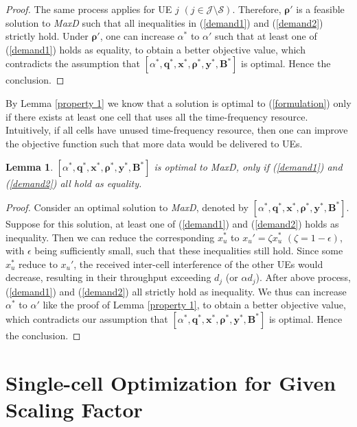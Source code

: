 \documentclass[10pt,journal,final,finalsubmission,twocolumn]{IEEEtran}
\newtheorem{lemma}[theorem]{Lemma}
\begin{document}
\begin{proof}
The same process applies for UE $j$ $(j\in \mathcal{J}\setminus\mathcal{S})$. Therefore, $\boldsymbol{\rho}'$ is a feasible solution to {\em MaxD} such that all inequalities in (\ref{demand1}) and (\ref{demand2}) strictly hold. Under $\boldsymbol{\rho}'$, one can increase $\alpha^*$ to $\alpha '$ such that at least one of (\ref{demand1}) holds as equality, to obtain a better objective value, which contradicts the assumption that $[\alpha^*, \boldsymbol{q}^*,\boldsymbol{x}^*,\boldsymbol{\rho}^*, \boldsymbol{y}^*,\boldsymbol{B}^*]$ is optimal. Hence the conclusion.
\end{proof}

By Lemma \ref{property 1} we know that a solution is optimal to (\ref{formulation}) only if there exists at least one cell that uses all the time-frequency resource. Intuitively, if all cells have unused time-frequency resource, then one can improve the objective function such that more data would be delivered to UEs. 

\begin{lemma}\label{property 2}
$[\alpha ^*, \boldsymbol{q}^*,\boldsymbol{x}^*,\boldsymbol{\rho}^*, \boldsymbol{y}^*,\boldsymbol{B}^*]$ is optimal to MaxD, only if (\ref{demand1}) and (\ref{demand2}) all hold as equality.
\end{lemma}
\begin{proof}
Consider an optimal solution to {\em MaxD}, denoted by $[\alpha ^*, \boldsymbol{q}^*,\boldsymbol{x}^*,\boldsymbol{\rho}^*, \boldsymbol{y}^*,\boldsymbol{B}^*]$. Suppose for this solution, at least one of (\ref{demand1}) and (\ref{demand2}) holds as inequality. Then we can reduce the corresponding $x_u^*$ to $x_u'=\zeta x_u^*$ $(\zeta =1-\epsilon )$, with $\epsilon $ being sufficiently small, such that these inequalities still hold. Since some $x_u^*$ reduce to $x_u'$, the received inter-cell interference of the other UEs would decrease, resulting in their throughput exceeding $d_j$ (or $\alpha d_j$). After above process, (\ref{demand1}) and (\ref{demand2}) all strictly hold as inequality. We thus can increase $\alpha^*$ to $\alpha'$ like the proof of Lemma \ref{property 1}, to obtain a better objective value, which contradicts our assumption that $[\alpha ^*, \boldsymbol{q}^*,\boldsymbol{x}^*,\boldsymbol{\rho}^*, \boldsymbol{y}^*,\boldsymbol{B}^*]$ is optimal. Hence the conclusion.
\end{proof}

\section{Single-cell Optimization for Given Scaling Factor}\label{CellLoadsMinimization}
\end{document}
